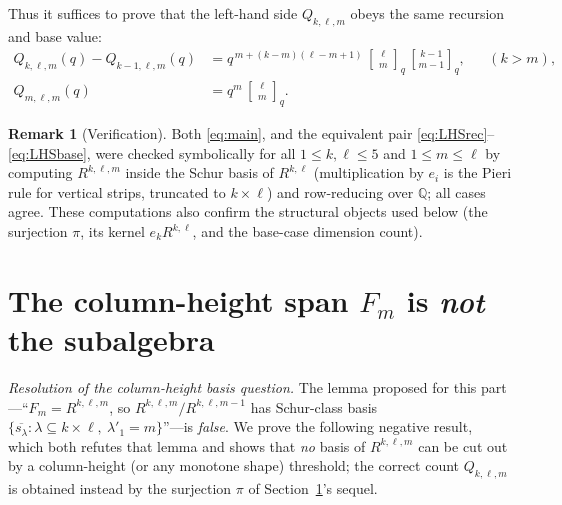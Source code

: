\documentclass{amsart}
\theoremstyle{definition}
\newtheorem{remark}{Remark}
\newcommand{\qbin}[2]{\genfrac{[}{]}{0pt}{}{#1}{#2}_q}
\newcommand{\Q}{\mathbb{Q}}
\newcommand{\rkl}{R^{k,\ell}}
\newcommand{\Rklm}{R^{k,\ell,m}}
\begin{document}
Thus it suffices to prove that the left-hand side $Q_{k,\ell,m}$ obeys the same
recursion and base value:
\begin{align}
\label{eq:LHSrec}
Q_{k,\ell,m}(q)-Q_{k-1,\ell,m}(q)
&= q^{\,m+(k-m)(\ell-m+1)}\,\qbin{\ell}{m}\,\qbin{k-1}{m-1},
&&(k>m),\\
\label{eq:LHSbase}
Q_{m,\ell,m}(q)&=q^{m}\,\qbin{\ell}{m}.
\end{align}

\begin{remark}[Verification]\label{rem:verif}
Both \eqref{eq:main}, and the equivalent pair \eqref{eq:LHSrec}--\eqref{eq:LHSbase},
were checked symbolically for all $1\le k,\ell\le5$ and $1\le m\le\ell$ by computing
$\Rklm$ inside the Schur basis of $\rkl$ (multiplication by $e_i$ is the Pieri rule
for vertical strips, truncated to $k\times\ell$) and row-reducing over $\Q$; all
cases agree. These computations also confirm the structural objects used below
(the surjection $\pi$, its kernel $e_k\rkl$, and the base-case dimension count).
\end{remark}

\section{The column-height span $F_m$ is \emph{not} the subalgebra}
\label{sec:Fm}

\noindent\emph{Resolution of the column-height basis question.} The lemma proposed
for this part---``$F_m=\Rklm$, so $\Rklm/R^{k,\ell,m-1}$ has Schur-class basis
$\{\overline{s_\lambda}:\lambda\subseteq k\times\ell,\ \lambda'_1=m\}$''---is
\emph{false}. We prove the following negative result, which both refutes that lemma
and shows that \emph{no} basis of $\Rklm$ can be cut out by a column-height (or any
monotone shape) threshold; the correct count $Q_{k,\ell,m}$ is obtained instead by
the surjection $\pi$ of Section~\ref{sec:Fm}'s sequel.
\end{document}
